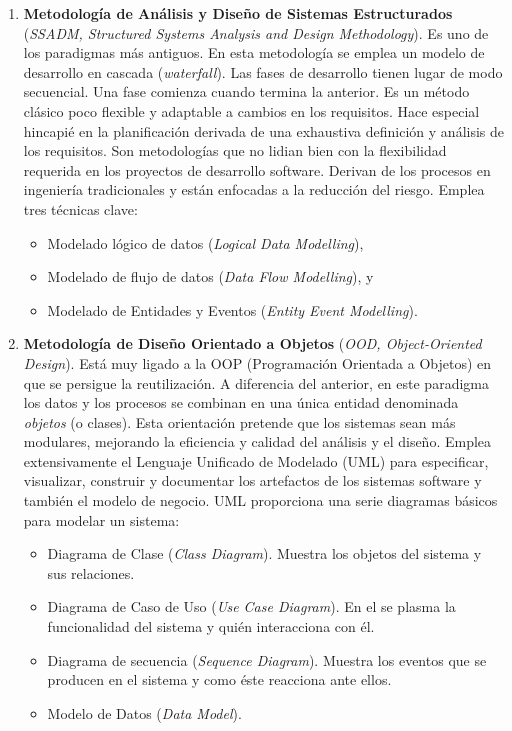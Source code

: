 \begin{enumerate}
\item \textbf{Metodología de Análisis y Diseño de Sistemas Estructurados} (\emph{SSADM, Structured Systems Analysis and Design Methodology}). Es uno de los paradigmas más antiguos. En esta metodología se emplea un modelo de desarrollo en cascada (\emph{waterfall}). Las fases de desarrollo tienen lugar de modo secuencial. Una fase comienza cuando termina la anterior. Es un método clásico poco flexible y adaptable a cambios en los requisitos. Hace especial hincapié en la planificación derivada de una exhaustiva definición y análisis de los requisitos. Son metodologías que no lidian bien con la flexibilidad requerida en los proyectos de desarrollo software. Derivan de los procesos en  ingeniería tradicionales y están enfocadas a la reducción del riesgo. Emplea tres técnicas clave:

\begin{itemize}
\item Modelado lógico de datos (\emph{Logical Data Modelling}),
\item Modelado de flujo de datos (\emph{Data Flow Modelling}), y
\item Modelado de Entidades y Eventos (\emph{Entity Event
  Modelling}).
\end{itemize} 

\item \textbf{Metodología de Diseño Orientado a Objetos} (\emph{OOD,  Object-Oriented Design}). Está muy ligado a la OOP (Programación Orientada a Objetos) en que se persigue la reutilización. A diferencia del anterior, en este paradigma los datos y los procesos se combinan en una única entidad denominada \emph{objetos} (o clases). Esta orientación pretende que los sistemas sean más modulares, mejorando la eficiencia y calidad del análisis y el diseño. Emplea extensivamente el Lenguaje Unificado de Modelado (UML) para especificar, visualizar, construir y documentar los artefactos de los sistemas software y  también el modelo de negocio. UML proporciona una serie diagramas básicos para modelar un sistema: 

\begin{itemize}
\item Diagrama de Clase (\emph{Class Diagram}). Muestra los objetos del sistema y sus relaciones. 
\item Diagrama de Caso de Uso (\emph{Use Case Diagram}). En el se plasma la
  funcionalidad del sistema y quién interacciona con él.
\item Diagrama de secuencia (\emph{Sequence Diagram}). Muestra los eventos que se
  producen en el sistema y como éste reacciona ante ellos. 
\item Modelo de Datos (\emph{Data Model}).
\end{itemize} 
                               

\end{enumerate}
